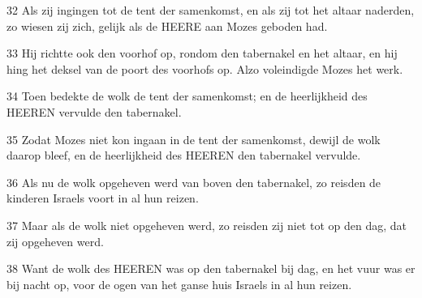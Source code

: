 \par 32 Als zij ingingen tot de tent der samenkomst, en als zij tot het altaar naderden, zo wiesen zij zich, gelijk als de HEERE aan Mozes geboden had.
\par 33 Hij richtte ook den voorhof op, rondom den tabernakel en het altaar, en hij hing het deksel van de poort des voorhofs op. Alzo voleindigde Mozes het werk.
\par 34 Toen bedekte de wolk de tent der samenkomst; en de heerlijkheid des HEEREN vervulde den tabernakel.
\par 35 Zodat Mozes niet kon ingaan in de tent der samenkomst, dewijl de wolk daarop bleef, en de heerlijkheid des HEEREN den tabernakel vervulde.
\par 36 Als nu de wolk opgeheven werd van boven den tabernakel, zo reisden de kinderen Israels voort in al hun reizen.
\par 37 Maar als de wolk niet opgeheven werd, zo reisden zij niet tot op den dag, dat zij opgeheven werd.
\par 38 Want de wolk des HEEREN was op den tabernakel bij dag, en het vuur was er bij nacht op, voor de ogen van het ganse huis Israels in al hun reizen.



